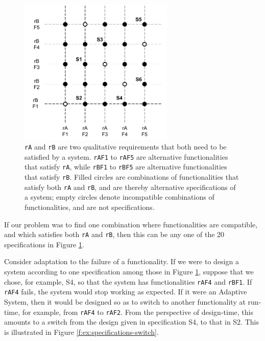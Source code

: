 \documentclass[graybox]{svmult}
\newcommand{\xt}[1]{\texttt{#1}}
\newcommand{\req}[1]{\xt{#1}}
\newcommand{\ASfull}{Adaptive System}
\begin{document}
\begin{figure}[t]
	\centering
	\includegraphics[height=70mm]{Figures/f-ex-specifications}
\caption{\req{rA} and \req{rB} are two qualitative requirements that both need to be satisfied by a system. \req{rAF1} to \req{rAF5} are alternative functionalities that satisfy \req{rA}, while \req{rBF1} to \req{rBF5} are alternative functionalities that satisfy \req{rB}. Filled circles are combinations of functionalities that satisfy both \req{rA} and \req{rB}, and are thereby alternative specifications of a system; empty circles denote incompatible combinations of functionalities, and are not specifications.}
\label{f:ex:specifications}
\end{figure}

If our problem was to find one combination where functionalities are compatible, and which satisfies both \req{rA} and \req{rB}, then this can be any one of the 20 specifications in Figure \ref{f:ex:specifications}.

Consider adaptation to the failure of a functionality. If we were to design a system according to one specification among those in Figure \ref{f:ex:specifications}, suppose that we chose, for example, S4, so that the system has functionalities \req{rAF4} and \req{rBF1}. If \req{rAF4} fails, the system would stop working as expected. If it were an \ASfull, then it would be designed so as to switch to another functionality at run-time, for example, from \req{rAF4} to \req{rAF2}. From the perspective of design-time, this amounts to a switch from the design given in specification S4, to that in S2. This is illustrated in Figure \ref{f:ex:specifications-switch}.
\end{document}
